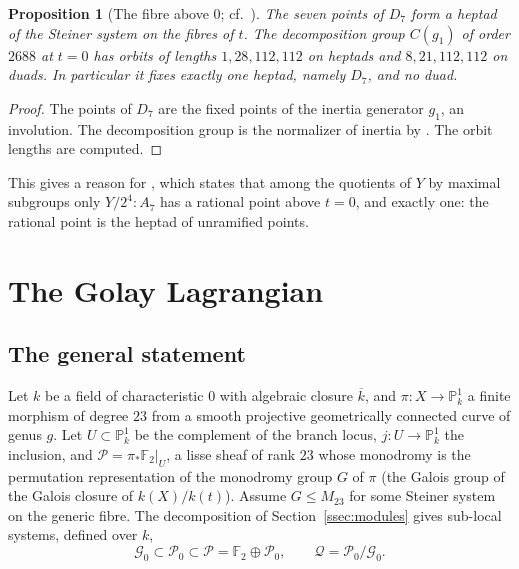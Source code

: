 \documentclass[11pt]{amsart}
\newtheorem{proposition}[theorem]{Proposition}
\theoremstyle{definition}
\newcommand{\FF}{\mathbb{F}}
\newcommand{\PP}{\mathbb{P}}
\newcommand{\kbar}{\overline{k}}
\newcommand{\M}{M_{23}}
\newcommand{\cG}{\mathcal{G}}
\newcommand{\cP}{\mathcal{P}}
\newcommand{\cQ}{\mathcal{Q}}
\begin{document}
\begin{proposition}[The fibre above $0$; cf.\ {\cite[\S8.2]{LeLay26}}]\label{prop:fibre0}
The seven points of $D_7$ form a heptad of the Steiner system on the fibres of $t$. The decomposition group $C(g_1)$ of order $2688$ at $t=0$ has orbits of lengths $1,28,112,112$ on heptads and $8,21,112,112$ on duads. In particular it fixes exactly one heptad, namely $D_7$, and no duad.
\end{proposition}
\begin{proof}
The points of $D_7$ are the fixed points of the inertia generator $g_1$, an involution. The decomposition group is the normalizer of inertia by \cite[proof of Prop.~3.26]{HJLPPZ26}. The orbit lengths are computed.
\end{proof}

This gives a reason for \cite[Prop.~3.26]{HJLPPZ26}, which states that among the quotients of $Y$ by maximal subgroups only $Y/2^4{:}A_7$ has a rational point above $t=0$, and exactly one: the rational point is the heptad of unramified points.

\section{The Golay Lagrangian}\label{sec:lagrangian}

\subsection{The general statement}
Let $k$ be a field of characteristic $0$ with algebraic closure $\kbar$, and $\pi\colon X\to\PP^1_k$ a finite morphism of degree $23$ from a smooth projective geometrically connected curve of genus $g$. Let $U\subset\PP^1_k$ be the complement of the branch locus, $j\colon U\to\PP^1_k$ the inclusion, and $\cP=\pi_*\FF_2|_U$, a lisse sheaf of rank $23$ whose monodromy is the permutation representation of the monodromy group $G$ of $\pi$ (the Galois group of the Galois closure of $k(X)/k(t)$). Assume $G\le\M$ for some Steiner system on the generic fibre. The decomposition of Section~\ref{ssec:modules} gives sub-local systems, defined over $k$,
\[
\cG_0\subset\cP_0\subset\cP=\FF_2\oplus\cP_0,\qquad \cQ=\cP_0/\cG_0 .
\]
\end{document}
